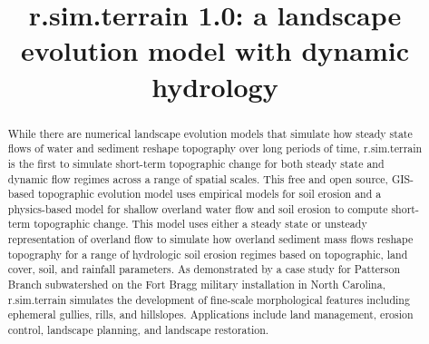 \documentclass[gmd, manuscript]{copernicus}
\begin{document}
\title{\lowercase{r.sim.terrain 1.0}: a landscape evolution model with dynamic hydrology} 






\received{}
\pubdiscuss{}
\revised{}
\accepted{}
\published{}


\maketitle

\begin{abstract}
While there are numerical landscape evolution models
that simulate how steady state flows of water and sediment
reshape topography over long periods of time, 
r.sim.terrain is the first to 
simulate short-term topographic change 
for both steady state and dynamic flow regimes
across a range of spatial scales.
This free and open source, 
GIS-based topographic evolution model
uses empirical models for soil erosion
and a physics-based model
for shallow overland water flow and soil erosion 
to compute short-term topographic change. 
This model uses either a steady state 
or unsteady representation of overland flow
to simulate how overland sediment mass flows reshape topography
for a range of hydrologic soil erosion regimes
based on topographic, land cover, soil, and rainfall parameters. 
As demonstrated by a case study 
for Patterson Branch subwatershed
on the Fort Bragg military installation in North Carolina,
r.sim.terrain simulates the development of 
fine-scale morphological features including 
ephemeral gullies, rills, and hillslopes.
Applications include land management, erosion control,
landscape planning, and landscape restoration. 
\end{abstract}
\end{document}
